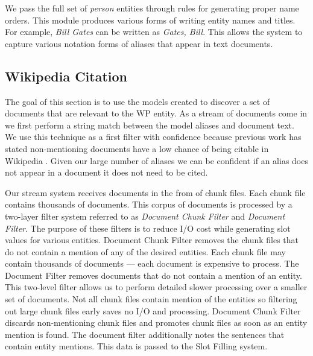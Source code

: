 We pass the full set of \textit{person} entities through rules for generating proper name orders.
This module produces various forms of writing entity names and titles.
For example, \textsl{Bill Gates} can be written as \textsl{Gates, Bill}.
This allows the system to capture various notation forms of aliases that appear in text documents.

\subsection{Wikipedia Citation}
The goal of this section is to use the models created to discover a set of documents that are relevant to the WP entity.
As a stream of documents come in we first perform a string match between the model aliases and document text. 
We use this technique as a first filter with confidence because previous work has stated non-mentioning
documents have a low chance of being citable in Wikipedia \cite{JFrank12}.
Given our large number of aliases we can be confident if an alias does not appear in a document it does not need to be cited.

Our stream system receives documents in the from of chunk files.
Each chunk file contains thousands of documents.
This corpus of documents is processed by a two-layer filter system referred to as \textit{Document Chunk Filter} and \textit{Document Filter}.
The purpose of these filters is to reduce I/O cost while generating slot values for various entities.
Document Chunk Filter removes the chunk files that do not contain a mention of any of the desired entities.
Each chunk file may contain thousands of documents --- each document is expensive to process.
The Document Filter removes documents that do not contain a mention of an  entity.
This two-level filter allows us to perform detailed slower processing over a smaller set of documents.
Not all chunk files contain mention of the entities so filtering out large chunk files early saves no I/O and processing.
Document Chunk Filter discards non-mentioning chunk files and promotes chunk files as soon as an entity mention is found.
The document filter additionally notes the sentences that contain entity mentions.
This data is passed to the Slot Filling system.


